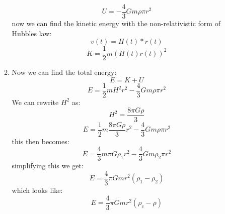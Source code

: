\documentclass{article}
\theoremstyle{plain}
\begin{document}
\begin{enumerate}
\begin{enumerate}[label=(\alph*)]
\begin{equation*}
                    \end{equation*}
                    \begin{equation*}
                        U = -\frac{4}{3}G m \rho \pi r^2
                    \end{equation*}
                    now we can find the kinetic energy with the non-relativistic form of Hubbles law:
                    \begin{equation*}
                        v(t) = H(t) * r(t)
                    \end{equation*}
                    \begin{equation*}
                        K = \frac{1}{2}m(H(t)r(t))^2
                    \end{equation*}
              \item Now we can find the total energy:
                    \begin{equation*}
                        E = K + U
                    \end{equation*}
                    \begin{equation*}
                        E = \frac{1}{2}m H^2r^2 - \frac{4}{3}G m \rho \pi r^2
                    \end{equation*}
                    We can rewrite $H^2$ as:
                    \begin{equation*}
                        H^2 = \frac{8\pi G \rho}{3}
                    \end{equation*}
                    \begin{equation*}
                        E = \frac{1}{2}m \frac{8\pi G \rho}{3}r^2 - \frac{4}{3}G m \rho \pi r^2
                    \end{equation*}
                    this then becomes:
                    \begin{equation*}
                        E = \frac{4}{3}m \pi G \rho_1 r^2 - \frac{4}{3}G m \rho_2 \pi r^2
                    \end{equation*}
                    simplifying this we get:
                    \begin{equation*}
                        E = \frac{4}{3}\pi G m   r^2 (\rho_1 - \rho_2)
                    \end{equation*}
                    which looks like:
                    \begin{equation*}
                        E = \frac{4}{3}\pi G m   r^2 (\rho_c - \rho)
                    \end{equation*}

\end{enumerate}
\end{enumerate}
\end{document}
